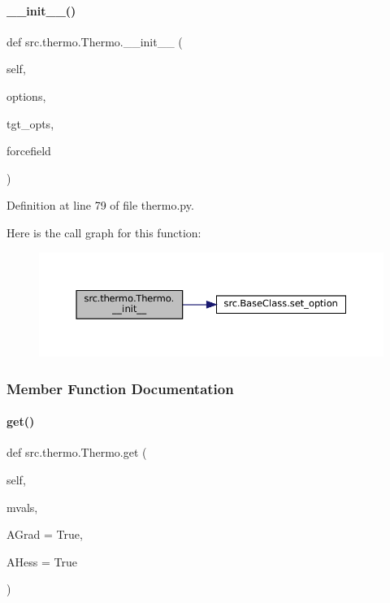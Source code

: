 \paragraph{\texorpdfstring{\+\_\+\+\_\+init\+\_\+\+\_\+()}{\_\_init\_\_()}}
{\footnotesize\ttfamily def src.\+thermo.\+Thermo.\+\_\+\+\_\+init\+\_\+\+\_\+ (\begin{DoxyParamCaption}\item[{}]{self,  }\item[{}]{options,  }\item[{}]{tgt\+\_\+opts,  }\item[{}]{forcefield }\end{DoxyParamCaption})}



Definition at line 79 of file thermo.\+py.

Here is the call graph for this function\+:
\nopagebreak
\begin{figure}[H]
\begin{center}
\leavevmode
\includegraphics[width=350pt]{classsrc_1_1thermo_1_1Thermo_a3278db2b6681f25efdd8185c9d2ac4fe_cgraph}
\end{center}
\end{figure}


\subsubsection{Member Function Documentation}
\mbox{\label{classsrc_1_1thermo_1_1Thermo_ac47eddac7bd3b77ef6f575941946f4bf}} 
\paragraph{\texorpdfstring{get()}{get()}}
{\footnotesize\ttfamily def src.\+thermo.\+Thermo.\+get (\begin{DoxyParamCaption}\item[{}]{self,  }\item[{}]{mvals,  }\item[{}]{A\+Grad = {\ttfamily True},  }\item[{}]{A\+Hess = {\ttfamily True} }\end{DoxyParamCaption})}



